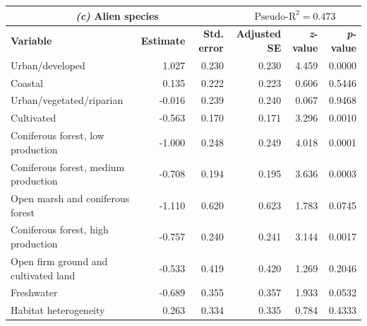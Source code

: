 \documentclass{article}
\begin{document}
\begin{table}[h]
\begin{tabular}{l r r r r r}
    \multicolumn{3}{c}{\textbf{\textit{(c)}  Alien species}} & \multicolumn{3}{c}{$\text{Pseudo-R}^2 = 0.473$} \\
    \hline
    \textbf{Variable} & \textbf{Estimate} & \textbf{Std. error} & \textbf{Adjusted SE} & \textbf{\textit{z}-value} & \textbf{\textit{p}-value} \\
    \hline
    Urban/developed                         & 1.027    & 0.230     & 0.230       & 4.459    & 0.0000    \\
    Coastal                                 & 0.135    & 0.222     & 0.223       & 0.606    & 0.5446    \\
    Urban/vegetated/riparian                & -0.016   & 0.239     & 0.240       & 0.067    & 0.9468    \\
    Cultivated                              & -0.563   & 0.170     & 0.171       & 3.296    & 0.0010    \\
    Coniferous forest, low production       & -1.000   & 0.248     & 0.249       & 4.018    & 0.0001    \\
    Coniferous forest, medium production    & -0.708   & 0.194     & 0.195       & 3.636    & 0.0003    \\
    Open marsh and coniferous forest        & -1.110   & 0.620     & 0.623       & 1.783    & 0.0745    \\
    Coniferous forest, high production      & -0.757   & 0.240     & 0.241       & 3.144    & 0.0017    \\
    Open firm ground and cultivated land    & -0.533   & 0.419     & 0.420       & 1.269    & 0.2046    \\
    Freshwater                              & -0.689   & 0.355     & 0.357       & 1.933    & 0.0532    \\
    Habitat heterogeneity                   & 0.263    & 0.334     & 0.335       & 0.784    & 0.4333    \\
    \hline
    \end{tabular}
\end{table}
\end{document}
